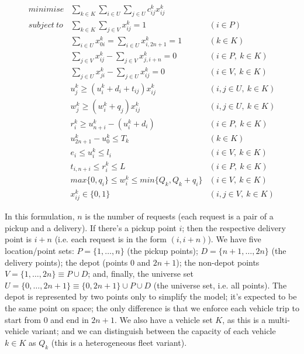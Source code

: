 \documentclass[english,plano-doutorado,twoside]{iiufrgs}
\begin{document}
\begin{align}
minimise &\sum_{k \in K}\sum_{i \in U}\sum_{j \in U} c^{k}_{ij} x^{k}_{ij} &\label{eq:objfun}\\
subject~to &\sum_{k \in K}\sum_{j \in V} x^{k}_{ij} = 1 & (i \in P)\label{eq:no_divide}\\
           &\sum_{i \in U}x^{k}_{0i} = \sum_{i \in U}x^{k}_{i,2n+1} = 1 & (k \in K)\label{eq:end_and_begin}\\
           &\sum_{j \in V}x^{k}_{ij} - \sum_{j \in V}x^{k}_{j,i+n} = 0& (i \in P,~k \in K)\label{eq:same_request_same_vehicle}\\
           &\sum_{j \in U}x^{k}_{ji} - \sum_{j \in U}x^{k}_{ij} = 0& (i \in V,~k \in K)\label{eq:no_bus_teleport}\\
           &u^{k}_{j} \geq (u^{k}_{i} + d_i + t_{ij})x^{k}_{ij} & (i,j \in U,~k\in K)\label{eq:travel_times}\\
           &w^{k}_{j} \geq (w^{k}_{i} + q_j)x^{k}_{ij} & (i,j \in U,~k\in K)\label{eq:capacity}\\
           &r^{k}_{i} \geq u^{k}_{n+i} -(u^{k}_{i} + d_i) & (i \in P,~k\in K)\label{eq:ride_time}\\
           &u^{k}_{2n+1} - u^k_0 \leq T_k & (k \in K)\label{eq:trip_time}\\
           &e_i \leq u^k_i \leq l_i & (i \in V,~k\in K)\label{eq:time_windows}\\
           &t_{i,n+i} \leq r^k_i \leq L & (i \in P,~k\in K)\label{eq:max_ride_time}\\
           &max\{0,q_i\} \leq w^k_i \leq min\{Q_k, Q_k + q_i\}&(i \in V,~k\in K)\label{eq:capacity2}\\
           &x^{k}_{ij} \in \{0,1\}&(i,j \in V,~k\in K)\label{eq:boolean}
\end{align}

In this formulation, \(n\) is the number of requests (each request is a pair of a pickup and a delivery). If there's a pickup point \(i\); then the respective delivery point is \(i + n\) (i.e. each request is in the form \((i, i + n)\)). We have five location/point sets: \(P = \{1, \dots, n\}\) (the pickup points); \(D = \{n+1, \dots, 2n\}\) (the delivery points); the depot (points \(0\) and \(2n + 1\)); the non-depot points \(V = \{1, \dots, 2n\} \equiv P \cup D\); and, finally, the universe set \(U = \{0, \dots, 2n + 1\} \equiv \{0, 2n + 1\} \cup P \cup D\) (the universe set, i.e. all points). The depot is represented by two points only to simplify the model; it's expected to be the same point on space; the only difference is that we enforce each vehicle trip to start from \(0\) and end in \(2n+1\). We also have a vehicle set \(K\), as this is a multi-vehicle variant; and we can distinguish between the capacity of each vehicle \(k \in K\) as \(Q_k\) (this is a heterogeneous fleet variant).
\end{document}
